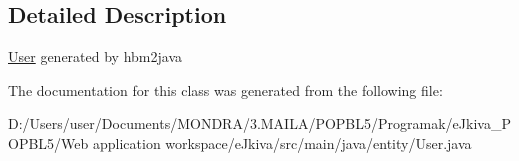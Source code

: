 \subsection{Detailed Description}
\mbox{\hyperlink{classentity_1_1_user}{User}} generated by hbm2java 

The documentation for this class was generated from the following file\+:\begin{DoxyCompactItemize}
\item 
D\+:/\+Users/user/\+Documents/\+M\+O\+N\+D\+R\+A/3.\+M\+A\+I\+L\+A/\+P\+O\+P\+B\+L5/\+Programak/e\+Jkiva\+\_\+\+P\+O\+P\+B\+L5/\+Web application workspace/e\+Jkiva/src/main/java/entity/User.\+java\end{DoxyCompactItemize}
